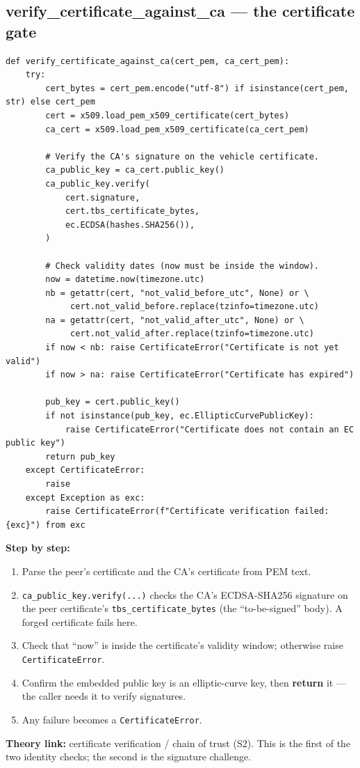 \documentclass[11pt,a4paper]{article}
\begin{document}
\subsection{verify\_certificate\_against\_ca --- the certificate gate}
\begin{lstlisting}[style=py,caption={auth\_protocol.py --- verify a peer certificate against the trusted CA.}]
def verify_certificate_against_ca(cert_pem, ca_cert_pem):
    try:
        cert_bytes = cert_pem.encode("utf-8") if isinstance(cert_pem, str) else cert_pem
        cert = x509.load_pem_x509_certificate(cert_bytes)
        ca_cert = x509.load_pem_x509_certificate(ca_cert_pem)

        # Verify the CA's signature on the vehicle certificate.
        ca_public_key = ca_cert.public_key()
        ca_public_key.verify(
            cert.signature,
            cert.tbs_certificate_bytes,
            ec.ECDSA(hashes.SHA256()),
        )

        # Check validity dates (now must be inside the window).
        now = datetime.now(timezone.utc)
        nb = getattr(cert, "not_valid_before_utc", None) or \
             cert.not_valid_before.replace(tzinfo=timezone.utc)
        na = getattr(cert, "not_valid_after_utc", None) or \
             cert.not_valid_after.replace(tzinfo=timezone.utc)
        if now < nb: raise CertificateError("Certificate is not yet valid")
        if now > na: raise CertificateError("Certificate has expired")

        pub_key = cert.public_key()
        if not isinstance(pub_key, ec.EllipticCurvePublicKey):
            raise CertificateError("Certificate does not contain an EC public key")
        return pub_key
    except CertificateError:
        raise
    except Exception as exc:
        raise CertificateError(f"Certificate verification failed: {exc}") from exc
\end{lstlisting}
\textbf{Step by step:}
\begin{enumerate}
  \item Parse the peer's certificate and the CA's certificate from PEM text.
  \item \texttt{ca\_public\_key.verify(...)} checks the CA's ECDSA-SHA256
        signature on the peer certificate's \texttt{tbs\_certificate\_bytes}
        (the ``to-be-signed'' body). A forged certificate fails here.
  \item Check that ``now'' is inside the certificate's validity window;
        otherwise raise \texttt{CertificateError}.
  \item Confirm the embedded public key is an elliptic-curve key, then
        \textbf{return} it --- the caller needs it to verify signatures.
  \item Any failure becomes a \texttt{CertificateError}.
\end{enumerate}
\textbf{Theory link:} certificate verification / chain of trust (S2). This is the
first of the two identity checks; the second is the signature challenge.
\end{document}
